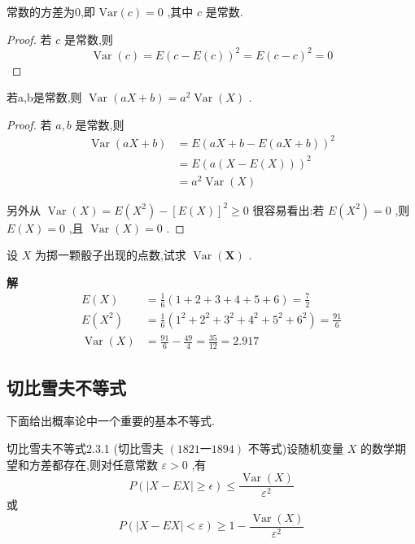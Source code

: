\begin{property}
	常数的方差为0,即 $ \mathrm{Var}(c)=0 $ ,其中 $ c $ 是常数.
\end{property}

\begin{proof}
	若 $ c $ 是常数,则
	\[
	\operatorname{Var}(c)=E(c-E(c))^{2}=E(c-c)^{2}=0
	\]
	
\end{proof}	


\begin{property}
	若a,b是常数,则 $ \operatorname{Var}(a X+b)=a^{2} \operatorname{Var}(X) $ .
\end{property}

\begin{proof}
	若 $ a,b $ 是常数,则
	\[
	\begin{aligned} \operatorname{Var}(a X+b) &=E(a X+b-E(a X+b))^{2} \\ &=E(a(X-E(X)))^{2} \\ &=a^{2} \operatorname{Var}(X) \end{aligned}
	\]
	
	另外从 $ \operatorname{Var}(X)=E\left(X^{2}\right)-[E(X)]^{2} \geqslant 0 $ 很容易看出:若 $ E(X^2)=0 $ ,则 $ E(X)=0 $ ,且 $ \operatorname{Var}(X)=0 $ .
	
\end{proof}

\begin{example}\label{exam:2.3.3}
	设 $ X $ 为掷一颗骰子出现的点数,试求 $ \operatorname{Var}(\boldsymbol{X}) $ .
	
	\textbf{解}
	\[
	\begin{array}{rl}
	{E(X)} & {=\frac{1}{6}(1+2+3+4+5+6)=\frac{7}{2}} \\ {E\left(X^{2}\right)} & {=\frac{1}{6}\left(1^{2}+2^{2}+3^{2}+4^{2}+5^{2}+6^{2}\right)=\frac{91}{6}} \\ {\operatorname{Var}(X)} & {=\frac{91}{6}-\frac{49}{4}=\frac{35}{12}=2.917}
	\end{array}
	\]
	
\end{example}

\subsection{切比雪夫不等式}\label{sec:2.3.3}

下面给出概率论中一个重要的基本不等式.

\begin{theorem}{切比雪夫不等式}{2.3.1}
	(切比雪夫 $ (1821一1894) $ 不等式)设随机变量 $ X $ 的数学期望和方差都存在,则对任意常数 $ \varepsilon>0 $ ,有
	\begin{equation}
	P(|X-E X| \geqslant \epsilon) \leqslant \frac{\operatorname{Var}(X)}{\varepsilon^{2}} \label{eq:2.3.2}
	\end{equation}
	或
	\begin{equation}
	P(|X-E X|<\varepsilon) \geqslant 1-\frac{\operatorname{Var}(X)}{\varepsilon^{2}} \label{eq:2.3.3}
	\end{equation}
\end{theorem}


